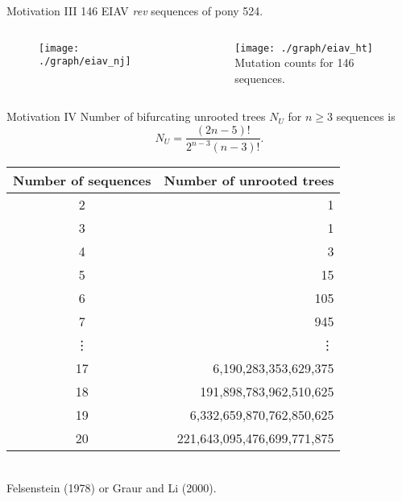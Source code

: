 \documentclass{beamer}
\begin{document}
\begin{frame}{Motivation III}
146 EIAV {\it rev} sequences of pony 524.

\vspace{-0.2cm}

\begin{columns}
\begin{column}{0.8\textwidth}
  \begin{figure}
  \texttt{[image: ./graph/eiav\_nj]}
  \end{figure}
\end{column}

\hspace{-1.0cm}

\begin{column}{0.4\textwidth}
  \begin{figure}
  \texttt{[image: ./graph/eiav\_ht]}
  \\
  {\tiny Mutation counts for 146 sequences.}
  \end{figure}
\end{column}

\end{columns}

\end{frame}


\begin{frame}{Motivation IV}
Number of bifurcating unrooted trees $N_U$ for $n\geq 3$ sequences is
$$
N_U = \frac{(2n - 5)!}{2^{n - 3} (n - 3)!}.
$$
\begin{center}
\begin{tabular}{cr} \hline\hline
Number of sequences & Number of unrooted trees \\ \hline
2 & 1 \\
3 & 1 \\
4 & 3 \\
5 & 15 \\
6 & 105 \\
7 & 945 \\
\vdots & \vdots \\
17 & 6,190,283,353,629,375 \\
18 & 191,898,783,962,510,625 \\
19 & 6,332,659,870,762,850,625 \\
20 & 221,643,095,476,699,771,875 \\ \hline\hline
\end{tabular}
\\
\scriptsize Felsenstein (1978) or Graur and Li (2000).
\end{center}

\end{frame}
\end{document}
